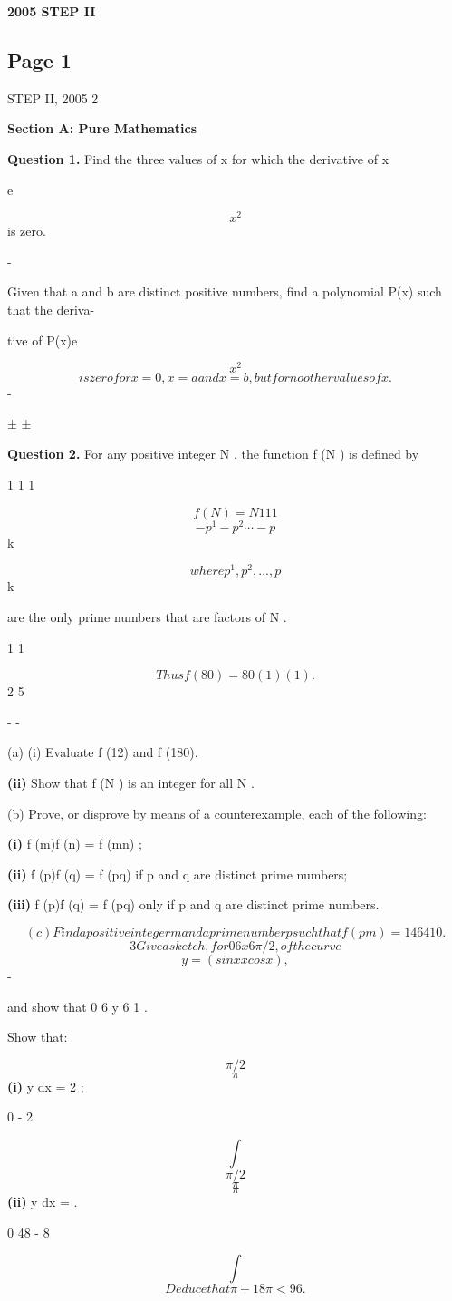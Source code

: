 \documentclass[12pt]{article}
\begin{document}
\begin{center}
{\Large \textbf{2005 STEP II}}
\end{center}

\subsection*{Page 1}
\begin{flushleft}
STEP II, 2005 2\par
\bigskip\textbf{Section A: Pure Mathematics}\par
\bigskip\textbf{Question 1.} Find the three values of x for which the derivative of x\par
e\par
\[x^2\]
is zero.\par
-\par
Given that a and b are distinct positive numbers, find a polynomial P(x) such that the deriva-\par
tive of P(x)e\par
\[x^2\]
\[is zero for x = 0, x = a and x = b , but for no other values of x.\]
-\par
± ±\par
\bigskip\textbf{Question 2.} For any positive integer N , the function f (N ) is defined by\par
1 1 1\par
\[f (N ) = N 1 1 1\]
\[- p^1 - p^2 \cdots - p\]
k\par
\gamma \delta\gamma \delta \gamma \delta\par
\[where p^1, p^2, . . . , p\]
k\par
are the only prime numbers that are factors of N .\par
1 1\par
\[Thus f (80) = 80(1 )(1 ) .\]
2 5\par
- -\par
(a) (i) Evaluate f (12) and f (180).\par
\textbf{(ii)} Show that f (N ) is an integer for all N .\par
(b) Prove, or disprove by means of a counterexample, each of the following:\par
\textbf{(i)} f (m)f (n) = f (mn) ;\par
\textbf{(ii)} f (p)f (q) = f (pq) if p and q are distinct prime numbers;\par
\textbf{(iii)} f (p)f (q) = f (pq) only if p and q are distinct prime numbers.\par
\[(c) Find a positive integer m and a prime number p such that f (pm) = 146410 .\]
\[3 Give a sketch, for 0 6 x 6 \pi/2, of the curve\]
\[y = (sin x x cos x) ,\]
-\par
and show that 0 6 y 6 1 .\par
Show that:\par
\[\pi/2\]
\[\pi\]
\textbf{(i)} y dx = 2 ;\par
0 - 2\par
\[\int\]
\[\pi/2\]
\[\pi\]
\[\pi\]
\textbf{(ii)} y dx = .\par
0 48 - 8\par
\[\int\]
\[Deduce that \pi + 18\pi < 96 .\]
\end{flushleft}
\end{document}
